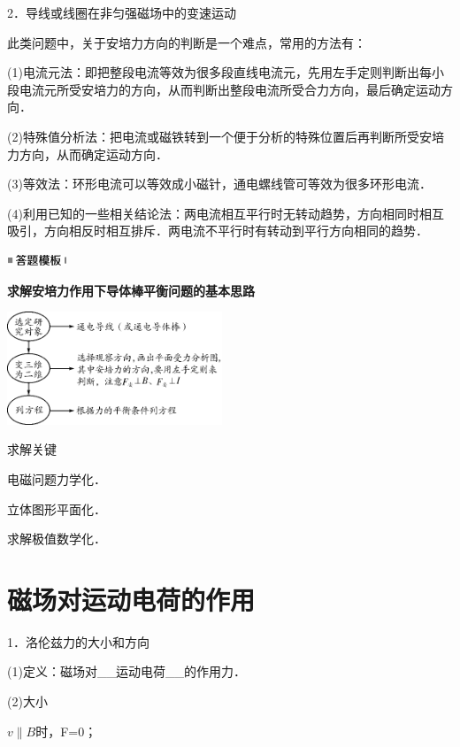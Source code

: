 \documentclass[cn,10.5pt,chinese,mac,chinesefont=founder]{elegantbook}
\begin{document}
2．导线或线圈在非匀强磁场中的变速运动

此类问题中，关于安培力方向的判断是一个难点，常用的方法有：

(1)电流元法：即把整段电流等效为很多段直线电流元，先用左手定则判断出每小段电流元所受安培力的方向，从而判断出整段电流所受合力方向，最后确定运动方向．

(2)特殊值分析法：把电流或磁铁转到一个便于分析的特殊位置后再判断所受安培力方向，从而确定运动方向．

(3)等效法：环形电流可以等效成小磁针，通电螺线管可等效为很多环形电流．

(4)利用已知的一些相关结论法：两电流相互平行时无转动趋势，方向相同时相互吸引，方向相反时相互排斥．两电流不平行时有转动到平行方向相同的趋势．


\begin{center}\includegraphics[width=0.70764in,height=0.12292in]{media/image25.png}\end{center}
\begin{center}
	\textbf{求解安培力作用下导体棒平衡问题的基本思路}
\end{center}

\begin{center}\includegraphics[width=2.52847in,height=1.32986in]{media/image345.png}\end{center}

求解关键

电磁问题力学化．

立体图形平面化．

求解极值数学化．

\newpage
\section{磁场对运动电荷的作用}

1．洛伦兹力的大小和方向

(1)定义：磁场对\_\_运动电荷\_\_的作用力．

(2)大小

$v\parallel B$时，F=0；
\end{document}
